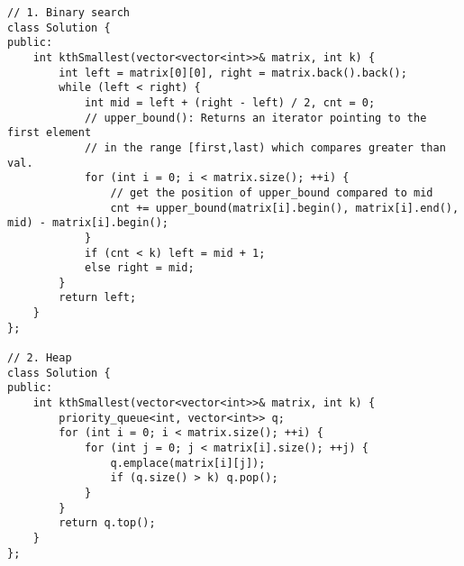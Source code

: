 \begin{lstlisting}
// 1. Binary search
class Solution {
public:
    int kthSmallest(vector<vector<int>>& matrix, int k) {
        int left = matrix[0][0], right = matrix.back().back();
        while (left < right) {
            int mid = left + (right - left) / 2, cnt = 0;
            // upper_bound(): Returns an iterator pointing to the first element 
            // in the range [first,last) which compares greater than val.
            for (int i = 0; i < matrix.size(); ++i) {
                // get the position of upper_bound compared to mid
                cnt += upper_bound(matrix[i].begin(), matrix[i].end(), mid) - matrix[i].begin();
            }
            if (cnt < k) left = mid + 1;
            else right = mid;
        }
        return left;
    }
};

// 2. Heap
class Solution {
public:
    int kthSmallest(vector<vector<int>>& matrix, int k) {
        priority_queue<int, vector<int>> q;
        for (int i = 0; i < matrix.size(); ++i) {
            for (int j = 0; j < matrix[i].size(); ++j) {
                q.emplace(matrix[i][j]);
                if (q.size() > k) q.pop();
            }
        }
        return q.top();
    }
};
\end{lstlisting}

